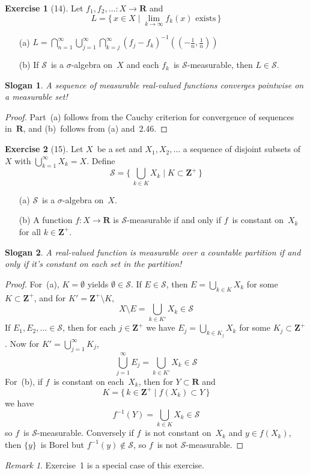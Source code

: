 \documentclass[letterpaper,12pt]{article}
\newcommand{\Z}{\mathbf{Z}}
\newcommand{\Zp}{\Z^+}
\newcommand{\R}{\mathbf{R}}
\renewcommand{\S}{\mathcal{S}}
\newcommand{\bigunion}{\bigcup}
\newcommand{\bigsect}{\bigcap}
\newcommand{\inv}[1]{#1^{-1}}
\theoremstyle{definition}
\newtheorem*{exer}{Exercise}
\theoremstyle{remark}
\newtheorem*{rmk}{Remark}
\theoremstyle{plain}
\newtheorem*{slogan}{Slogan}
\begin{document}
\begin{exer}[14]
Let \(f_1,f_2,\ldots:X\to\R\) and
\[L=\{\,x\in X\mid\lim_{k\to\infty}f_k(x)\text{ exists}\,\}\]
\begin{enumerate}[itemsep=0pt]
\item[(a)] \(\displaystyle L=\bigsect_{n=1}^{\infty}\bigunion_{j=1}^{\infty}\bigsect_{k=j}^{\infty}\inv{(f_j-f_k)}((-\tfrac{1}{n},\tfrac{1}{n}))\)
\item[(b)] If \(\S\)~is a \(\sigma\)-algebra on~\(X\) and each \(f_k\)~is \(\S\)-measurable, then \(L\in\S\).
\end{enumerate}
\end{exer}
\begin{slogan}
A sequence of measurable real-valued functions converges pointwise on a measurable set!
\end{slogan}
\begin{proof}
Part~(a) follows from the Cauchy criterion for convergence of sequences in~\(\R\), and (b)~follows from (a) and~2.46.
\end{proof}

\begin{exer}[15]
Let \(X\)~be a set and \(X_1,X_2,\ldots\) a sequence of disjoint subsets of~\(X\) with \(\bigunion_{k=1}^{\infty}X_k=X\). Define
\[\S=\{\,\bigunion_{k\in K}X_k\mid K\subset\Zp\,\}\]
\begin{enumerate}[itemsep=0pt]
\item[(a)] \(\S\)~is a \(\sigma\)-algebra on~\(X\).
\item[(b)] A function \(f:X\to\R\) is \(\S\)-measurable if and only if \(f\)~is constant on~\(X_k\) for all \(k\in\Zp\).
\end{enumerate}
\end{exer}
\begin{slogan}
A real-valued function is measurable over a countable partition if and only if it's constant on each set in the partition!
\end{slogan}
\begin{proof}
For~(a), \(K=\emptyset\) yields \(\emptyset\in\S\). If \(E\in\S\), then \(E=\bigunion_{k\in K}X_k\) for some \(K\subset\Zp\), and for \(K'=\Zp\setminus K\),
\[X\setminus E=\bigunion_{k\in K'}X_k\in\S\]
If \(E_1,E_2,\ldots\in\S\), then for each \(j\in\Zp\) we have \(E_j=\bigunion_{k\in K_j}X_k\) for some \(K_j\subset\Zp\). Now for \(K'=\bigunion_{j=1}^{\infty}K_j\),
\[\bigunion_{j=1}^{\infty}E_j=\bigunion_{k\in K'}X_k\in\S\]
For~(b), if \(f\)~is constant on each~\(X_k\), then for \(Y\subset\R\) and
\[K=\{\,k\in\Zp\mid f(X_k)\subset Y\,\}\]
we have
\[\inv{f}(Y)=\bigunion_{k\in K}X_k\in\S\]
so \(f\)~is \(\S\)-measurable. Conversely if \(f\)~is not constant on~\(X_k\) and \(y\in f(X_k)\), then \(\{y\}\)~is Borel but \(\inv{f}(y)\not\in\S\), so \(f\)~is not \(\S\)-measurable.
\end{proof}
\begin{rmk}
Exercise~1 is a special case of this exercise.
\end{rmk}
\end{document}
